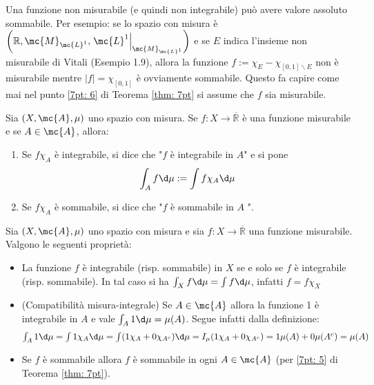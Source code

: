 \begin{oss}
    Una funzione non misurabile (e quindi non integrabile) può avere valore assoluto sommabile. Per esempio: se lo spazio con misura è $\left(\mathbb{R}, \mc{M}_{\mc{L}^{1}},\left.\mc{L}^{1}\right|_{\mc{M}_{\mc{L}^{1}}}\right)$ e se $E$ indica l'insieme non misurabile di Vitali (Esempio 1.9), allora la funzione $f:=\chi_{E}-\chi_{[0,1] \backslash E}$ non è misurabile mentre $|f|=\chi_{[0,1]}$ è ovviamente sommabile. Questo fa capire come mai nel punto \ref{7pt: 6} di Teorema \ref{thm: 7pt} si assume che $f$ sia misurabile.
\end{oss}


\begin{boxdef}
    Sia $(X, \mc{A}, \mu)$ uno spazio con misura. Se $f: X \rightarrow \overline{\mathbb{R}}$ è una funzione misurabile e se $A \in \mc{A}$, allora:
    \begin{enumerate}[label=$(\roman*)$]
        \item Se $f \chi_{A}$ è integrabile, si dice che "$f$ è integrabile in $A$" e si pone
        \[
        \int_{A} f \d \mu:=\int f \chi_{A} \d \mu
        \]
        \item Se $f \chi_{A}$ è sommabile, si dice che "$f$ è sommabile in $A$ ".
    \end{enumerate}
\end{boxdef}


\begin{oss}
    Sia $(X, \mc{A}, \mu)$ uno spazio con misura e sia $f: X \rightarrow \overline{\mathbb{R}}$ una funzione misurabile. Valgono le seguenti proprietà:
    
    \begin{itemize}
      \item La funzione $f$ è integrabile (risp. sommabile) in $X$ se e solo se $f$ è integrabile (risp. sommabile). In tal caso si ha $\int_{X} f \d \mu=\int f \d \mu$, infatti $f=f\chi_X$
    
      \item (Compatibilità misura-integrale) Se $A \in \mc{A}$ allora la funzione 1 è integrabile in $A$ e vale $\int_{A} 1 \d \mu=\mu(A)$. Segue infatti dalla definizione:
      \[\textstyle\int_A1\d\mu = \int1\chi_A\d\mu = \int (1\chi_A+0\chi_{A^c})\d\mu = I_{\mu}(1\chi_A+0\chi_{A^c}) = 1\mu(A)+0\mu(A^c)=\mu(A)\]
    
      \item Se $f$ è sommabile allora $f$ è sommabile in ogni $A \in \mc{A}$ (per \ref{7pt: 5} di Teorema \ref{thm: 7pt}).
    
    \end{itemize}
\end{oss}

